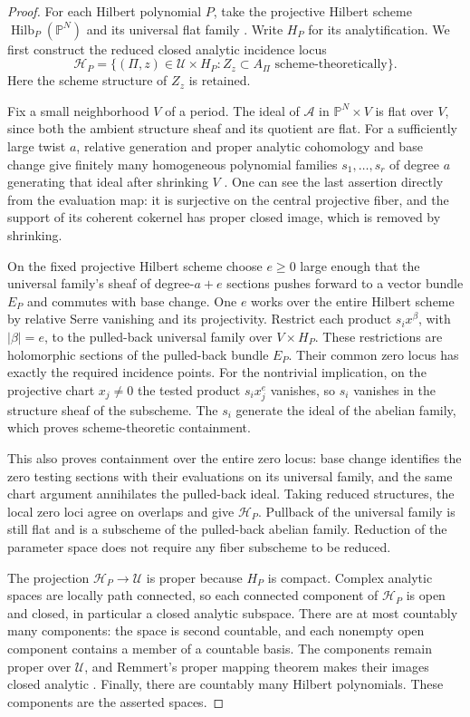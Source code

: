 \documentclass[11pt]{article}
\theoremstyle{definition}
\theoremstyle{remark}
\numberwithin{equation}{section}
\begin{document}
\begin{proof}
For each Hilbert polynomial $P$, take the projective Hilbert scheme
$\operatorname{Hilb}_P(\mathbb P^N)$ and its universal flat family
\cite{grothendieck-hilbert}.  Write $H_P$ for its analytification.  We
first construct the reduced closed analytic incidence locus
\[
 \mathcal H_P=\{(\Pi,z)\in\mathcal U\times H_P:
                     Z_z\subset A_\Pi\text{ scheme-theoretically}\}.
\]
Here the scheme structure of $Z_z$ is retained.

Fix a small neighborhood $V$ of a period.  The ideal of $\mathscr A$
in $\mathbb P^N\times V$ is flat over $V$, since both the ambient
structure sheaf and its quotient are flat.  For a sufficiently large
twist $a$, relative generation and proper analytic cohomology and base
change give finitely many homogeneous polynomial families
$s_1,\ldots,s_r$ of degree $a$ generating that ideal after shrinking
$V$ \cite{grauert-remmert}.  One can see the last assertion directly
from the evaluation map: it is surjective on the central projective
fiber, and the support of its coherent cokernel has proper closed image,
which is removed by shrinking.

On the fixed projective Hilbert scheme choose $e\ge0$ large enough that
the universal family's sheaf of degree-$a+e$ sections pushes forward to
a vector bundle $E_P$ and commutes with base change.  One $e$ works
over the entire Hilbert scheme by relative Serre vanishing and its
projectivity.  Restrict each product $s_i x^\beta$, with $|\beta|=e$,
to the pulled-back universal family over $V\times H_P$.  These
restrictions are holomorphic sections of the pulled-back bundle $E_P$.
Their common zero locus has exactly the required incidence points.
For the nontrivial implication, on the projective chart $x_j\ne0$ the
tested product $s_i x_j^e$ vanishes, so $s_i$ vanishes in the structure
sheaf of the subscheme.  The $s_i$ generate the ideal of the abelian
family, which proves scheme-theoretic containment.

This also proves containment over the entire zero locus: base change
identifies the zero testing sections with their evaluations on its
universal family, and the same chart argument annihilates the pulled-back
ideal.  Taking reduced structures, the local zero loci agree on overlaps
and give $\mathcal H_P$.  Pullback of the universal family is still flat
and is a subscheme of the pulled-back abelian family.  Reduction of the
parameter space does not require any fiber subscheme to be reduced.

The projection $\mathcal H_P\to\mathcal U$ is proper because $H_P$ is
compact.  Complex analytic spaces are locally path connected, so each
connected component of $\mathcal H_P$ is open and closed, in particular
a closed analytic subspace.  There are at most countably many components:
the space is second countable, and each nonempty open component contains
a member of a countable basis.  The components remain proper over
$\mathcal U$, and Remmert's proper mapping theorem makes their images
closed analytic \cite{grauert-remmert}.  Finally, there are countably
many Hilbert polynomials.  These components are the asserted spaces.
\end{proof}
\end{document}
